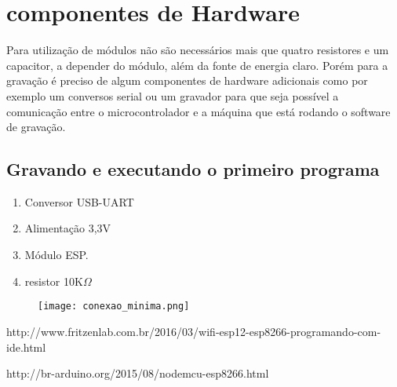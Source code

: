 \documentclass[a4paper]{article}
\begin{document}
\section{componentes de Hardware}
Para utilização de módulos não são necessários mais que quatro resistores e um capacitor, a depender do módulo, além da fonte de energia claro.
Porém para a gravação é preciso de algum componentes de hardware adicionais como por exemplo um conversos serial ou um gravador para que seja possível a comunicação entre o microcontrolador e a máquina que está rodando o software de gravação.

\subsection{Gravando e executando o primeiro programa}
\begin{enumerate}
\item Conversor USB-UART
\item Alimentação 3,3V
\item Módulo ESP.
\item resistor 10K$\Omega$
\end{enumerate}

\begin{figure}
\centering
\texttt{[image: conexao\_minima.png]}
\end{figure}

http://www.fritzenlab.com.br/2016/03/wifi-esp12-esp8266-programando-com-ide.html

http://br-arduino.org/2015/08/nodemcu-esp8266.html
\end{document}
